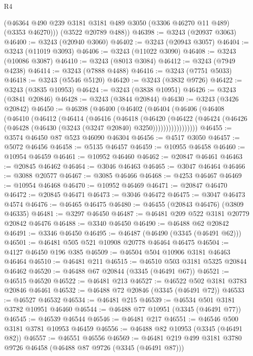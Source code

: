 \begin{lexlean}{R4}
\begin{coremodule}
        (@46364 @490 @239 @3181 @3181 @489 @3050 (@3306 @46270 @11 @489) (@3353 @46270)))
      (@3522 @20789 @488))
@46398 := @3243 (@20937 @3063)
@46400 := @3243 (@20940 @3060)
@46402 := @3243 (@20943 @3057)
@46404 := @3243 (@11019 @3093)
@46406 := @3243 (@11022 @3090)
@46408 := @3243 (@10086 @3087)
@46410 := @3243 (@8013 @3084)
@46412 := @3243 (@7949 @4238)
@46414 := @3243 (@7888 @4488)
@46416 := @3243 (@7751 @5033)
@46418 := @3243 (@5546 @5120)
@46420 := @3243 (@3832 @9726)
@46422 := @3243 (@3835 @10953)
@46424 := @3243 (@3838 @10951)
@46426 := @3243 (@3841 @20846)
@46428 := @3243 (@3844 @20844)
@46430 := @3243 (@3426 @20842)
@46450 := @46398
    (@46400
      (@46402
        (@46404
          (@46406
            (@46408
              (@46410
                (@46412
                  (@46414
                    (@46416
                      (@46418
                        (@46420
                          (@46422
                            (@46424
                              (@46426 (@46428 (@46430 (@3243 (@3247 @20840) @3250)))))))))))))))))
@46455 := @3574 @46450 @87 @523 @46090 @46304
@46456 := @4517 @3050
@46457 := @5072 @46456
@46458 := @5135 @46457
@46459 := @10955 @46458
@46460 := @10954 @46459
@46461 := @10952 @46460
@46462 := @20847 @46461
@46463 := @20845 @46462
@46464 := @3046 @46463
@46465 := @3047 @46464
@46466 := @3088 @20577
@46467 := @3085 @46466
@46468 := @4253 @46467
@46469 := @10954 @46468
@46470 := @10952 @46469
@46471 := @20847 @46470
@46472 := @20845 @46471
@46473 := @3046 @46472
@46475 := @3047 @46473 @4574
@46476 := @46465 @46475
@46480 := @46455 (@20843 @46476) (@3809 @46335)
@46481 := @3297 @46450
@46487 := @46481 @209 @522 @3181 @20779 @20842 @46476
@46488 := @3340 @46450
@46490 := @46488 @62 @20842
@46491 := @3346 @46450
@46495 := @46487 (@46490 (@3345 (@46491 @62)))
@46501 := @46481 @505 @521 @10908 @20778 @46464 @46475
@46504 := @4127 @46450 @196 @385
@46509 := @46504 @504 @10906 @3181 @46463 @46464
@46510 := @46481 @211
@46515 := @46510 @503 @3181 @5325 @20844 @46462
@46520 := @46488 @67 @20844 (@3345 (@46491 @67))
@46521 := @46515 @46520
@46522 := @46481 @213
@46527 := @46522 @502 @3181 @3783 @20846 @46461
@46532 := @46488 @72 @20846 (@3345 (@46491 @72))
@46533 := @46527 @46532
@46534 := @46481 @215
@46539 := @46534 @501 @3181 @3782 @10951 @46460
@46544 := @46488 @77 @10951 (@3345 (@46491 @77))
@46545 := @46539 @46544
@46546 := @46481 @217
@46551 := @46546 @500 @3181 @3781 @10953 @46459
@46556 := @46488 @82 @10953 (@3345 (@46491 @82))
@46557 := @46551 @46556
@46569 := @46481 @219 @499 @3181 @3780 @9726 @46458 (@46488 @87 @9726 (@3345 (@46491 @87)))

\end{coremodule}
\end{lexlean}
